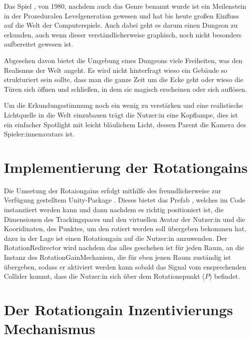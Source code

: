 Das Spiel , von 1980, nachdem auch das Genre  benannt wurde ist ein Meilenstein in der Prozeduralen Levelgeneration gewesen und hat bis heute großen Einfluss auf die Welt der Computerspiele. Auch dabei geht es darum einen Dungeon zu erkunden, auch wenn dieser verständlicherweise graphisch, noch nicht besonders aufbereitet gewesen ist.

Abgesehen davon bietet die Umgebung eines Dungeons viele Freiheiten, was den Realismus der Welt angeht. Es wird nicht hinterfragt wieso ein Gebäude so strukturiert sein sollte, dass man die ganze Zeit um die Ecke geht oder wieso die Türen sich öffnen und schließen, in dem sie magisch erscheinen oder sich auflösen.

Um die Erkundungsstimmung noch ein wenig zu verstärken und eine realistische Lichtquelle in die Welt einzubauen trägt die Nutzer:in eine Kopflampe, dies ist ein einfacher Spotlight mit leicht bläulichem Licht, dessen Parent die Kamera des Spieler:innenavatars ist.



\section{Implementierung der Rotationgains}

Die Umsetung der Rotaiongains erfolgt mithilfe des
freundlicherweise zur Verfügung gestelltem Unity-Package . Dieses bietet das Prefab , welches im Code instanziiert werden kann und dann nachdem es richtig positioniert ist, die Dimensionen des Trackingspaces und den virtuellen Avatar der Nutzer:in und die Kooridinaten, des Punktes, um den rotiert werden soll übergeben bekommen hat, dazu in der Lage ist einen Rotationgain auf die Nutzer:in anzuwenden. Der RotationRedirector wird nachdem das alles geschehen ist für jeden Raum, an die Instanz des RotationGainMechanism, die für eben jenen Raum zuständig ist übergeben, sodass er aktiviert werden kann sobald das Signal vom ensprechenden Collider kommt, dass die Nutzer:in sich über dem Rotationspunkt ($P$) befindet.

\section{Der Rotationgain Inzentivierungs Mechanismus}
\label{sec:rotgaininc}

